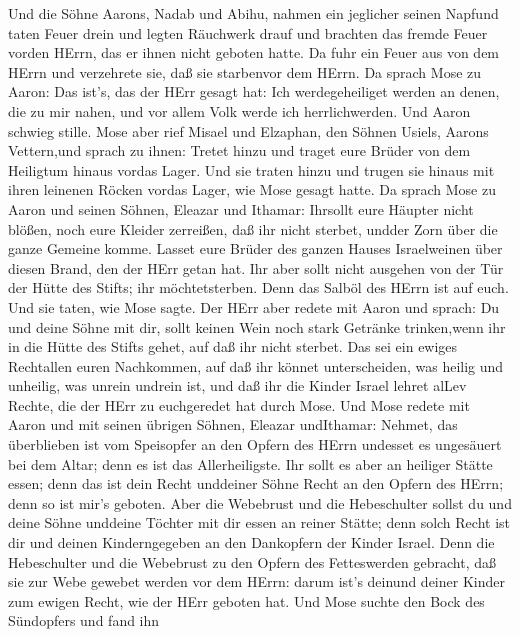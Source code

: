  Und die Söhne Aarons, Nadab und Abihu, nahmen ein jeglicher
seinen Napfund taten Feuer drein und legten Räuchwerk drauf und brachten
das fremde Feuer vorden HErrn, das er ihnen nicht geboten hatte.
 Da fuhr ein Feuer aus von dem HErrn und verzehrete sie, daß
sie starbenvor dem HErrn.  Da sprach Mose zu Aaron: Das
ist's, das der HErr gesagt hat: Ich werdegeheiliget werden an denen, die
zu mir nahen, und vor allem Volk werde ich herrlichwerden. Und Aaron
schwieg stille.  Mose aber rief Misael und Elzaphan, den
Söhnen Usiels, Aarons Vettern,und sprach zu ihnen: Tretet hinzu und
traget eure Brüder von dem Heiligtum hinaus vordas Lager. 
Und sie traten hinzu und trugen sie hinaus mit ihren leinenen Röcken
vordas Lager, wie Mose gesagt hatte.  Da sprach Mose zu
Aaron und seinen Söhnen, Eleazar und Ithamar: Ihrsollt eure Häupter
nicht blößen, noch eure Kleider zerreißen, daß ihr nicht sterbet, undder
Zorn über die ganze Gemeine komme. Lasset eure Brüder des ganzen Hauses
Israelweinen über diesen Brand, den der HErr getan hat.  Ihr
aber sollt nicht ausgehen von der Tür der Hütte des Stifts; ihr
möchtetsterben. Denn das Salböl des HErrn ist auf euch. Und sie taten,
wie Mose sagte.  Der HErr aber redete mit Aaron und sprach:
 Du und deine Söhne mit dir, sollt keinen Wein noch stark
Getränke trinken,wenn ihr in die Hütte des Stifts gehet, auf daß ihr
nicht sterbet. Das sei ein ewiges Rechtallen euren Nachkommen,
 auf daß ihr könnet unterscheiden, was heilig und unheilig,
was unrein undrein ist,  und daß ihr die Kinder Israel
lehret alLev Rechte, die der HErr zu euchgeredet hat durch Mose.
 Und Mose redete mit Aaron und mit seinen übrigen Söhnen,
Eleazar undIthamar: Nehmet, das überblieben ist vom Speisopfer an den
Opfern des HErrn undesset es ungesäuert bei dem Altar; denn es ist das
Allerheiligste.  Ihr sollt es aber an heiliger Stätte
essen; denn das ist dein Recht unddeiner Söhne Recht an den Opfern des
HErrn; denn so ist mir's geboten.  Aber die Webebrust und
die Hebeschulter sollst du und deine Söhne unddeine Töchter mit dir
essen an reiner Stätte; denn solch Recht ist dir und deinen
Kinderngegeben an den Dankopfern der Kinder Israel.  Denn
die Hebeschulter und die Webebrust zu den Opfern des Fetteswerden
gebracht, daß sie zur Webe gewebet werden vor dem HErrn: darum ist's
deinund deiner Kinder zum ewigen Recht, wie der HErr geboten hat.
 Und Mose suchte den Bock des Sündopfers und fand ihn
